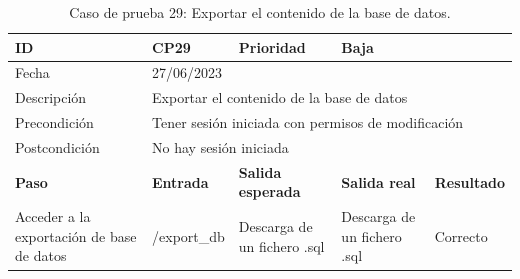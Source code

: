 \begin{table}[H]
\small
\begin{tabular}{p{} p{} p{} p{} p{}}
\cellcolor{gray!25}
ID   & CP29 & \cellcolor{gray!25} Prioridad   & Baja \\ \hline
\cellcolor{gray!25} Fecha	&	\multicolumn{4}{l}{27/06/2023} \\ \hline
\cellcolor{gray!25} Descripción		&	\multicolumn{4}{l}{Exportar el contenido de la base de datos} \\ \hline                                            
\cellcolor{gray!25}
Precondición  & \multicolumn{4}{p{.66\textwidth}}{Tener sesión iniciada con permisos de modificación} \\ \hline
\cellcolor{gray!25} Postcondición & \multicolumn{4}{l}{No hay sesión iniciada}                                                    \\ \hline
\rowcolor{gray!25}
\textbf{Paso}   & \textbf{Entrada} & \textbf{Salida esperada} & \textbf{Salida real} & \textbf{Resultado} \\ \hline
Acceder a la exportación de base de datos
& /export\_db                                                                          
& Descarga de un fichero .sql                               
& Descarga de un fichero .sql                            
& Correcto                            
\\ \hline
\end{tabular}
\caption{Caso de prueba 29: Exportar el contenido de la base de datos.}\label{table:CP29}
\end{table}

